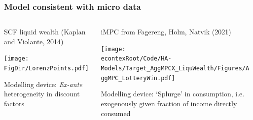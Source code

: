 \documentclass[pdflatex]{beamer}
\begin{document}
\begin{frame}
\frametitle{Model consistent with micro data}
\begin{columns}
	\begin{column}{0.5\textwidth}
		SCF liquid wealth (Kaplan and Violante, 2014) 
		
		\texttt{[image: \\FigDir/LorenzPoints.pdf]}
		
		Modelling device: \textit{Ex-ante} heterogeneity in discount factors
		
	\end{column}
	
	\begin{column}{0.5\textwidth}  	
		iMPC from Fagereng, Holm, Natvik (2021)	
		
		\texttt{[image: \\econtexRoot/Code/HA-Models/Target\_AggMPCX\_LiquWealth/Figures/AggMPC\_LotteryWin.pdf]}
		
		Modelling device: `Splurge' in consumption, i.e. exogenously given fraction of income directly consumed
	\end{column}
\end{columns}
\end{frame}
\end{document}
